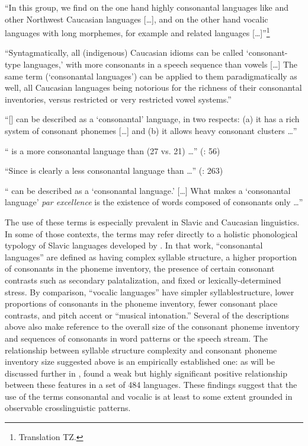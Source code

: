 \ea\label{ex:1.13}
   “In this group, we find on the one hand highly consonantal languages like  and other Northwest Caucasian languages […], and on the other hand vocalic languages with long morphemes, for example  and related languages […]”\footnote{{Translation TZ.}}
\citep[309]{Skalička1979}
\z

\ea\label{ex:1.14}
   “Syntagmatically, all (indigenous) Caucasian idioms can be called ‘consonant-type languages,’ with more consonants in a speech sequence than vowels […] The same term (‘consonantal languages’) can be applied to them paradigmatically as well, all Caucasian languages being notorious for the richness of their consonantal inventories, versus restricted or very restricted vowel systems.” 
\citep[43]{Chirikba2008}
\z

\ea\label{ex:1.15}
  “[] can be described as a ‘consonantal’ language, in two respects: 
  (a) it has a rich system of consonant phonemes […] and (b) it allows heavy consonant clusters …” 
\citep[103]{Jassem2003}
\z

\ea\label{ex:1.16}
   “ is a more consonantal language than  (27 vs. 21) …” 
(\citealt{DresslerEtAl2015}: 56)
\z

\ea\label{ex:1.17}
  “Since  is clearly a less consonantal language than  …” 
(\citealt{DresslerDziubalska-Kołaczyk2006}: 263)
\z

\ea\label{ex:1.18}
  “ can be described as a ‘consonantal language.’ […] What makes  a ‘consonantal language’ \textit{par excellence} is the existence of words composed of consonants only …” 
\citep[216]{Ridouane2014}
\z

The use of these terms is especially prevalent in Slavic and Caucasian linguistics. In some of those contexts, the terms may refer directly to a holistic phonological typology of Slavic languages developed by \citet{Isačenko1939/1940}. In that work, ``consonantal languages'' are defined as having complex syllable structure, a higher proportion of consonants in the phoneme inventory, the presence of certain consonant contrasts such as secondary palatalization, and fixed or lexically-determined stress. By comparison, ``vocalic languages'' have simpler syllable\linebreak structure, lower proportions of consonants in the phoneme inventory, fewer consonant place contrasts, and pitch accent or ``musical intonation.'' Several of the descriptions above also make reference to the overall size of the consonant phoneme inventory and sequences of consonants in word patterns or the speech stream. The relationship between syllable structure complexity and consonant phoneme inventory size suggested above is an empirically established one: as will be discussed further in , \citet{Maddieson2013a} found a weak but highly significant positive relationship between these features in a set of 484 languages. These findings suggest that the use of the terms consonantal and vocalic is at least to some extent grounded in observable crosslinguistic patterns.

